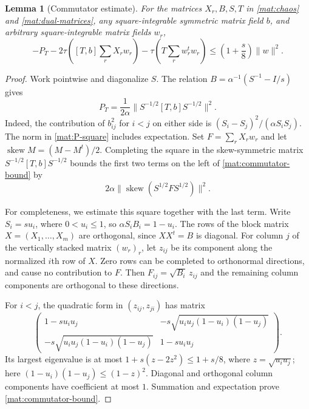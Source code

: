 \documentclass[11pt]{article}
\newtheorem{lemma}[theorem]{Lemma}
\theoremstyle{definition}
\theoremstyle{remark}
\numberwithin{equation}{section}
\begin{document}
\begin{lemma}[Commutator estimate]\label{mat:commutator}
For the matrices $X_r,B,S,T$ in \eqref{mat:chaos} and
\eqref{mat:dual-matrices}, any square-integrable symmetric matrix field $b$, and arbitrary
square-integrable matrix fields $w_r$,
\begin{equation}\label{mat:commutator-bound}
 -P_T-2\tau\left([T,b]\sum_rX_rw_r\right)
       -\tau\left(T\sum_rw_r^tw_r\right)
 \le\left(1+\frac s8\right)\|w\|^2.
\end{equation}
\end{lemma}

\begin{proof}
Work pointwise and diagonalize $S$.  The relation
$B=\alpha^{-1}(S^{-1}-I/s)$ gives
\begin{equation}\label{mat:P-square}
 P_T=\frac1{2\alpha}
       \bigl\|S^{-1/2}[T,b]S^{-1/2}\bigr\|^2.
\end{equation}
Indeed, the contribution of $b_{ij}^2$ for $i<j$ on either side is
$(S_i-S_j)^2/(\alpha S_iS_j)$.  The norm in
\eqref{mat:P-square} includes expectation.
Set $F=\sum_rX_rw_r$ and let $\operatorname{skew}M=(M-M^t)/2$.
Completing the square in the skew-symmetric matrix
$S^{-1/2}[T,b]S^{-1/2}$ bounds the first two terms on the left of
\eqref{mat:commutator-bound} by
\[
 2\alpha\bigl\|\operatorname{skew}(S^{1/2}FS^{1/2})\bigr\|^2.
\]

For completeness, we estimate this square together with the last term.
Write $S_i=su_i$, where $0<u_i\le1$, so
$\alpha S_iB_i=1-u_i$.  The rows of the block matrix
$X=(X_1,\ldots,X_m)$ are orthogonal, since $XX^t=B$ is diagonal.
For column $j$ of the vertically stacked matrix $(w_r)_r$, let $z_{ij}$
be its component along the normalized $i$th row of $X$.  Zero rows can
be completed to orthonormal directions, and cause no contribution to
$F$.  Then $F_{ij}=\sqrt{B_i}\,z_{ij}$ and the remaining column
components are orthogonal to these directions.

For $i<j$, the quadratic form in $(z_{ij},z_{ji})$ has matrix
\[
 \begin{pmatrix}
 1-su_iu_j&-s\sqrt{u_iu_j(1-u_i)(1-u_j)}\\
 -s\sqrt{u_iu_j(1-u_i)(1-u_j)}&1-su_iu_j
 \end{pmatrix}.
\]
Its largest eigenvalue is at most
$1+s(z-2z^2)\le1+s/8$, where $z=\sqrt{u_iu_j}$; here
$(1-u_i)(1-u_j)\le(1-z)^2$.
Diagonal and orthogonal column components have coefficient at most
$1$.  Summation and expectation prove \eqref{mat:commutator-bound}.
\end{proof}
\end{document}
